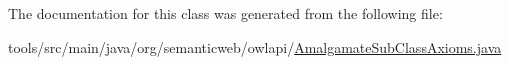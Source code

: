 The documentation for this class was generated from the following file\-:\begin{DoxyCompactItemize}
\item 
tools/src/main/java/org/semanticweb/owlapi/\hyperlink{_amalgamate_sub_class_axioms_8java}{Amalgamate\-Sub\-Class\-Axioms.\-java}\end{DoxyCompactItemize}
